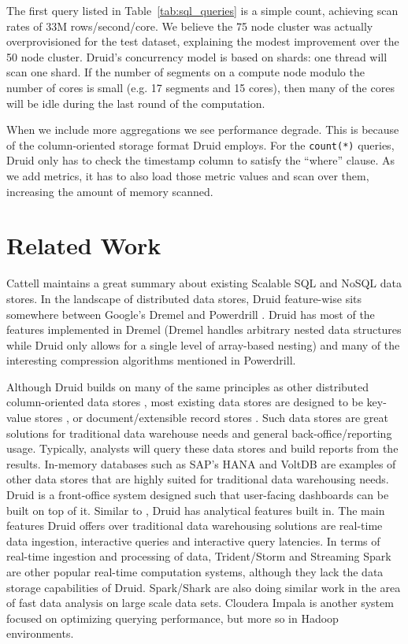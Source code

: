 \documentclass{vldb}
\begin{document}
The first query listed in Table~\ref{tab:sql_queries} is a simple
count, achieving scan rates of 33M rows/second/core. We believe
the 75 node cluster was actually overprovisioned for the test
dataset, explaining the modest improvement over the 50 node cluster.
Druid's concurrency model is based on shards: one thread will scan one
shard. If the number of segments on a compute node modulo the number
of cores is small (e.g. 17 segments and 15 cores), then many of the
cores will be idle during the last round of the computation.

When we include more aggregations we see performance degrade.  This is
because of the column-oriented storage format Druid employs.  For the
\texttt{count(*)} queries, Druid only has to check the timestamp column to satisfy
the ``where'' clause.  As we add metrics, it has to also load those metric
values and scan over them, increasing the amount of memory scanned.

\section{Related Work}
\label{sec:related}
Cattell \cite{cattell2011scalable} maintains a great summary about existing Scalable SQL and
NoSQL data stores. In the landscape of distributed data stores, Druid
feature-wise sits somewhere between Google’s Dremel \cite{melnik2010dremel} and Powerdrill
\cite{hall2012processing}. Druid has most of the features implemented in Dremel (Dremel
handles arbitrary nested data structures while Druid only allows for a
single level of array-based nesting) and many of the interesting
compression algorithms mentioned in Powerdrill.

Although Druid builds on many of the same principles as other
distributed column-oriented data stores \cite{fink2012distributed}, most existing data
stores are designed to be key-value stores \cite{lerner2010redis}, or
document/extensible record stores \cite{stonebraker2005c}. Such data stores are great
solutions for traditional data warehouse needs and general
back-office/reporting usage. Typically, analysts will query these data
stores and build reports from the results. In-memory databases such as
SAP’s HANA \cite{farber2012sap} and VoltDB \cite{voltdb2010voltdb} are examples of other data stores that
are highly suited for traditional data warehousing needs. Druid is a
front-office system designed such that user-facing dashboards can be
built on top of it. Similar to \cite{paraccel2013}, Druid has analytical features
built in. The main features Druid offers over traditional data
warehousing solutions are real-time data ingestion, interactive
queries and interactive query latencies. In terms of real-time
ingestion and processing of data, Trident/Storm \cite{marz2013storm} and Streaming
Spark \cite{zaharia2012discretized} are other popular real-time computation systems, although
they lack the data storage capabilities of Druid. Spark/Shark \cite{engle2012shark} are
also doing similar work in the area of fast data analysis on large
scale data sets. Cloudera Impala \cite{cloudera2013} is another system focused on
optimizing querying performance, but more so in Hadoop environments.
\end{document}
